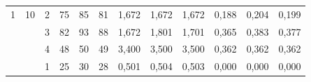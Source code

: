 \documentclass[licencjacka]{pracamgr}
\begin{document}
\begin{table}[H]
{\begin{tabular}{@{}cccccccccccc@{}}
1                                                              & 10                                                     & 2    & 75                                                     & 85                                                     & 81                                                        & 1,672                                                     & 1,672                                                      & 1,672                                                         & 0,188                                                              & 0,204                                                               & 0,199                                                                 \\
                                                               &                                                        & 3    & 82                                                     & 93                                                     & 88                                                        & 1,672                                                     & 1,801                                                      & 1,701                                                         & 0,365                                                              & 0,383                                                               & 0,377                                                                 \\
                                                               &                                                        & 4    & 48                                                     & 50                                                     & 49                                                        & 3,400                                                     & 3,500                                                      & 3,500                                                         & 0,362                                                              & 0,362                                                               & 0,362                                                                 \\ \midrule
                                                               &                                                        & 1    & 25                                                     & 30                                                     & 28                                                        & 0,501                                                     & 0,504                                                      & 0,503                                                         & 0,000                                                              & 0,000                                                               & 0,000                                                                 \\

\end{tabular}}
\end{table}
\end{document}

